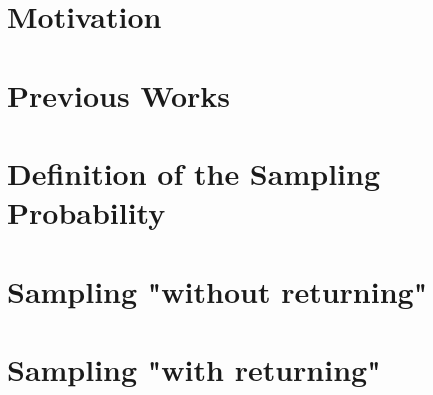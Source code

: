 \section{Motivation}
\section{Previous Works}
\section{Definition of the Sampling Probability}
\section{Sampling "without returning"}
\section{Sampling "with returning"}
